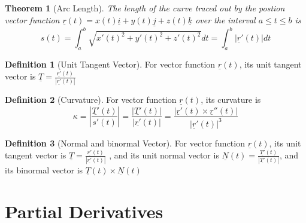 \documentclass[12pt,a4paper]{article}
\newtheorem{theorem}{Theorem}[subsection]
\theoremstyle{definition}
\newtheorem{definition}{Definition}[section]
\theoremstyle{remark}
\begin{document}
\begin{theorem}[Arc Length]
	The length of the curve traced out by the postion vector function $ \underline{r}(t)=x(t) \underline{i} + y(t) \underline{j} + z(t) \underline{k} $ over the interval $ a \leq t \leq b$ is 
\[
s(t)=\int_a^b \sqrt{x'(t)^2 + y'(t)^2 + z'(t)^2} dt = \int_a^b | \underline{r}'(t) | dt
\]

\end{theorem}

\begin{definition}[Unit Tangent Vector]
	
	For vector function $ \underline{r}(t) $, its unit tangent vector is $ \underline{T} = \displaystyle\frac{ \underline{r'}(t)}{| \underline{r'}(t)|} $
\end{definition}

\begin{definition}[Curvature]
	For vector function $ \underline{r}(t) $, its curvature is
	$$\kappa = \left|\frac{ \underline{T'}(t)}{s'(t)}\right| = \frac{| \underline{T'}(t)|}{| \underline{r'}(t)|}= \frac{ |\underline{r}'(t) \times \underline{r}''(t)|}{| \underline{r}'(t)|^3} $$
	
\end{definition}

\begin{definition}[Normal and binormal Vector]
	For vector function $ \underline{r}(t) $, its unit tangent vector is $ \underline{T} = \displaystyle\frac{ \underline{r'}(t)}{| \underline{r'}(t)|} $
	, and its unit normal vector is $ \underline{N}(t) = \displaystyle\frac{ \underline{T'}(t)}{| \underline{T'}(t)|}$, and its binormal vector is $ \underline{T}(t) \times \underline{N}(t) $
\end{definition}


\section{Partial Derivatives}
\end{document}
